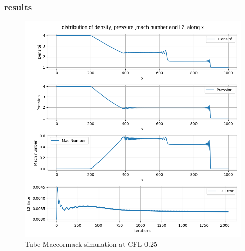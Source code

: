 \documentclass[12pt]{article}
\begin{document}
\subsubsection{results}

\begin{figure}[H] %
    \centering
    \includegraphics[width=\textwidth,height=\textheight,keepaspectratio]{PLOTS/tube_macormack_CFL25.png}
    \caption{Tube Maccormack simulation at CFL 0.25}
    \label{fig:your_label}
\end{figure}
\end{document}
